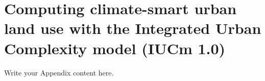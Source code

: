 
\chapter{Computing climate-smart urban land use with the Integrated Urban Complexity model (IUCm 1.0)} %

\label{chp:iucm} %

Write your Appendix content here.